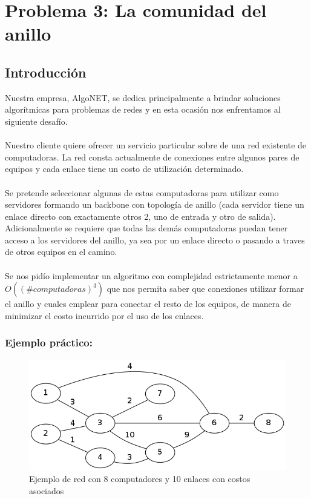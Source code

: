 \section{Problema 3: La comunidad del anillo}

\subsection{Introducci\'on}

Nuestra empresa, AlgoNET, se dedica principalmente a brindar soluciones algor\'itmicas para problemas de redes y en esta ocasi\'on nos enfrentamos al siguiente desaf\'io.
\\
\\
Nuestro cliente quiere ofrecer un servicio particular sobre de una red existente de computadoras. La red consta actualmente de conexiones entre algunos pares de equipos y cada enlace tiene un costo de utilizaci\'on determinado.
\\
\\
Se pretende seleccionar algunas de estas computadoras para utilizar como servidores formando un backbone con topolog\'ia de anillo (cada servidor tiene un enlace directo con exactamente otros 2, uno de entrada y otro de salida).
Adicionalmente se requiere que todas las dem\'as computadoras puedan tener acceso a los servidores del anillo, ya sea por un enlace directo o pasando a traves de otros equipos en el camino.
\\
\\
Se nos pid\'io implementar un algoritmo con complejidad estrictamente menor a $O((\#computadoras)^3)$ que nos permita saber que conexiones utilizar formar el anillo y cuales emplear para conectar el resto de los equipos, de manera de minimizar el costo incurrido por el uso de los enlaces.


\subsubsection{Ejemplo pr\'actico:}

\begin{figure}[h]
  \centering
    \includegraphics[scale=0.45]{ej3/intro1.png}
  \caption{Ejemplo de red con 8 computadores y 10 enlaces con costos asociados}
  \label{fig:ejemplo}
\end{figure}

